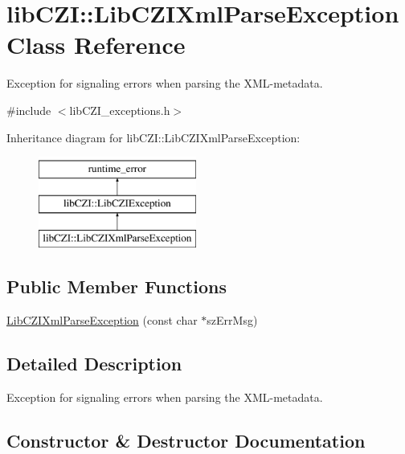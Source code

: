 \hypertarget{classlib_c_z_i_1_1_lib_c_z_i_xml_parse_exception}{}\section{lib\+C\+ZI\+:\+:Lib\+C\+Z\+I\+Xml\+Parse\+Exception Class Reference}
\label{classlib_c_z_i_1_1_lib_c_z_i_xml_parse_exception}


Exception for signaling errors when parsing the X\+M\+L-\/metadata.  




{\ttfamily \#include $<$lib\+C\+Z\+I\+\_\+exceptions.\+h$>$}

Inheritance diagram for lib\+C\+ZI\+:\+:Lib\+C\+Z\+I\+Xml\+Parse\+Exception\+:\begin{figure}[H]
\begin{center}
\leavevmode
\includegraphics[height=3.000000cm]{classlib_c_z_i_1_1_lib_c_z_i_xml_parse_exception}
\end{center}
\end{figure}
\subsection*{Public Member Functions}
\begin{DoxyCompactItemize}
\item 
\hyperlink{classlib_c_z_i_1_1_lib_c_z_i_xml_parse_exception_adfe0a6c32d816bd079e668534c619648}{Lib\+C\+Z\+I\+Xml\+Parse\+Exception} (const char $\ast$sz\+Err\+Msg)
\end{DoxyCompactItemize}


\subsection{Detailed Description}
Exception for signaling errors when parsing the X\+M\+L-\/metadata. 

\subsection{Constructor \& Destructor Documentation}
\mbox{\label{classlib_c_z_i_1_1_lib_c_z_i_xml_parse_exception_adfe0a6c32d816bd079e668534c619648}} 
